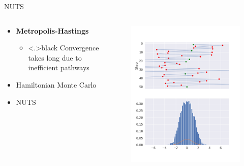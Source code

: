 \documentclass{beamer}
\begin{document}
\begin{frame}{NUTS}
\begin{columns}
\begin{column}{0.5\textwidth}
    \begin{itemize}
        \item \textbf{Metropolis-Hastings}
        \begin{itemize}
            \item \color<.>{black} Convergence takes long due to inefficient pathways
        \end{itemize}
        \color{gray}
        \item Hamiltonian Monte Carlo
        \item NUTS
    \end{itemize}
\end{column}
\begin{column}{0.5\textwidth}
\begin{figure}
    \centering
    \includegraphics[width=\linewidth]{samplingresult.png}
\end{figure}

\end{column}
\end{columns}
\end{frame}
\end{document}
